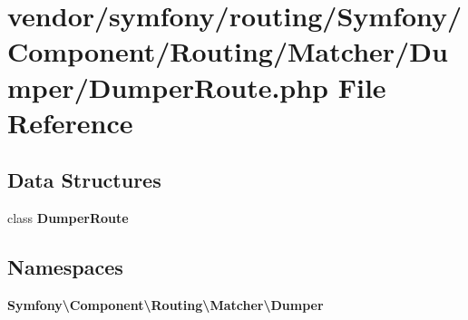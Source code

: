 \section{vendor/symfony/routing/\+Symfony/\+Component/\+Routing/\+Matcher/\+Dumper/\+Dumper\+Route.php File Reference}
\label{_dumper_route_8php}
\subsection*{Data Structures}
\begin{DoxyCompactItemize}
\item 
class {\bf Dumper\+Route}
\end{DoxyCompactItemize}
\subsection*{Namespaces}
\begin{DoxyCompactItemize}
\item 
 {\bf Symfony\textbackslash{}\+Component\textbackslash{}\+Routing\textbackslash{}\+Matcher\textbackslash{}\+Dumper}
\end{DoxyCompactItemize}
